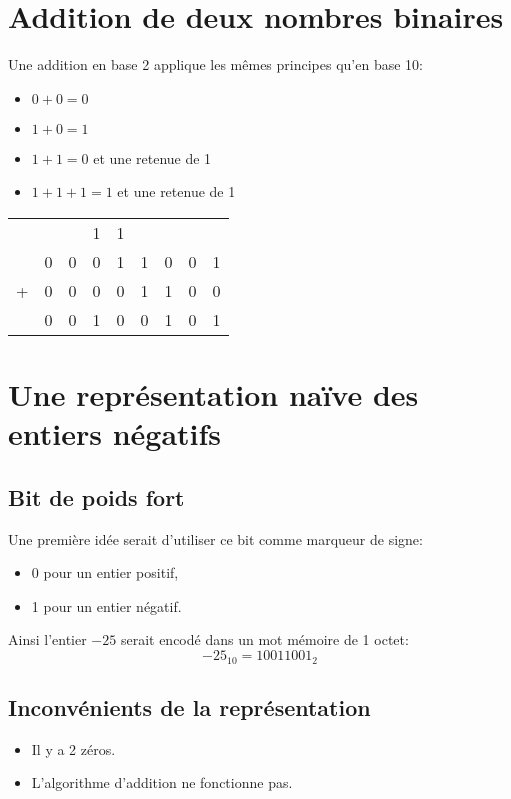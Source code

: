 \documentclass[a4paper,11pt]{article}
\begin{document}
\begin{center}
\end{center}
\section{Addition de deux nombres binaires}
Une addition en base 2 applique les mêmes principes qu'en base 10:
    \begin{itemize}
        \item $0 + 0 = 0$
        \item $1 + 0 = 1$
        \item $1 + 1 = 0$ et une retenue de 1
        \item $1 + 1 + 1 = 1$ et une retenue de 1
    \end{itemize}
    \begin{center}
        \begin{tabular}{*{9}{c}}
              &   &   & {\small 1} & {\small 1} &   &   &   &   \\
              & 0 & 0 & 0          & 1          & 1 & 0 & 0 & 1 \\
            + & 0 & 0 & 0          & 0          & 1 & 1 & 0 & 0 \\
            \hline
              & 0 & 0 & 1          & 0          & 0 & 1 & 0 & 1 \\
        \end{tabular}
    \end{center}
    \section{Une représentation naïve des entiers négatifs}
    \subsection{Bit de poids fort}
    Une première idée serait d'utiliser ce bit comme marqueur de signe:
    \begin{itemize}
        \item 0 pour un entier positif,
        \item 1 pour un entier négatif.
    \end{itemize}
    Ainsi l'entier $-25$ serait encodé dans un mot mémoire de 1 octet:
    $$-25_{10} = 10011001_2$$
    \subsection{Inconvénients de la représentation}
\begin{itemize}
    \item Il y a 2 zéros.
    \item L'algorithme d'addition ne fonctionne pas.
\end{itemize}
\end{document}
